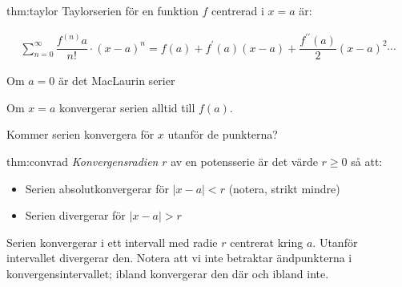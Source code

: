 \begin{theo}{thm:taylor}
  \noindent Taylorserien för en funktion $f$ centrerad i $x=a$ är:


  \begin{equation*}
    \begin{gathered}
      \sum_{n=0}^{\infty}\dfrac{f^{(n)}a}{n!}\cdot(x-a)^n = f(a)+f^{\prime}(a)(x-a)+\dfrac{f^{\prime\prime}(a)}{2}(x-a)^2\cdots
    \end{gathered}
  \end{equation*}
  \par\bigskip
  \noindent Om $a = 0$ är det MacLaurin serier
  \par\bigskip
  \noindent Om $x = a$ konvergerar serien alltid till $f(a)$.
\end{theo}
\par\bigskip
\noindent Kommer serien konvergera för $x$ utanför de punkterna?
\par\bigskip

\begin{theo}[Konvergensradie]{thm:convrad}
  \textit{Konvergensradien} $r$ av en potensserie är det värde $r\geq0$ så att:
  \begin{itemize}
    \item Serien absolutkonvergerar för $\left|x-a\right|< r$ (notera, strikt mindre)
    \item Serien divergerar för $\left|x-a\right|>r$
  \end{itemize}
  \par\bigskip
  \noindent Serien konvergerar i ett intervall med radie $r$ centrerat kring $a$. Utanför intervallet divergerar den. Notera att vi inte betraktar ändpunkterna i konvergensintervallet; ibland konvergerar den där och ibland inte. 
\end{theo}
\par\bigskip

